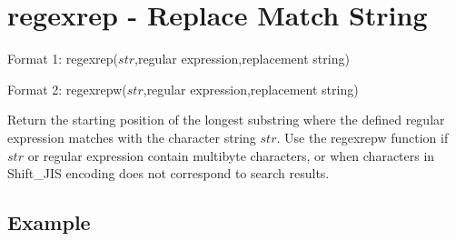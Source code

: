 
%

\section{regexrep - Replace Match String\label{sect:regexrep}}

Format 1: regexrep($str$,regular expression,replacement string)

Format 2: regexrepw($str$,regular expression,replacement string)

Return the starting position of the longest substring where the defined regular expression matches with the character string $str$. Use the regexrepw function if $str$  or regular expression contain multibyte characters, or when characters in Shift\_JIS encoding does not correspond to search results. 

\subsection*{Example}


%

